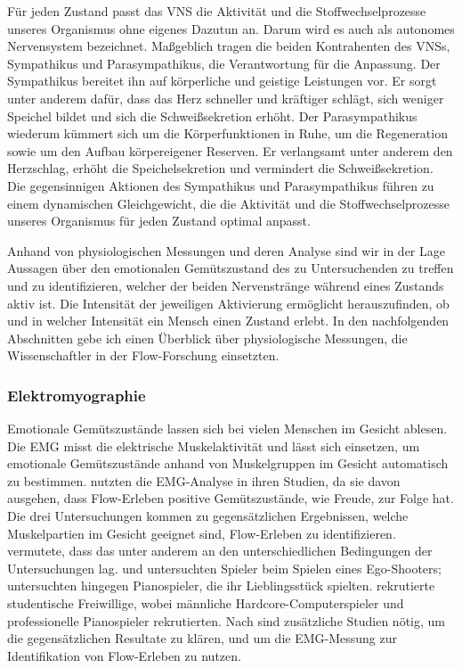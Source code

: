 Für jeden Zustand passt das \ac{VNS} die Aktivität und die Stoffwechselprozesse unseres Organismus ohne eigenes Dazutun an. Darum wird es auch als autonomes Nervensystem bezeichnet. Maßgeblich tragen die beiden Kontrahenten des \ac{VNS}s, Sympathikus und Parasympathikus, die Verantwortung für die Anpassung. Der Sympathikus bereitet ihn auf körperliche und geistige Leistungen vor. Er sorgt unter anderem dafür, dass das Herz schneller und kräftiger schlägt, sich weniger Speichel bildet und sich die Schweißsekretion erhöht. Der Parasympathikus wiederum kümmert sich um die Körperfunktionen in Ruhe, um die Regeneration sowie um den Aufbau körpereigener Reserven. Er verlangsamt unter anderem den Herzschlag, erhöht die Speichelsekretion und vermindert die Schweißsekretion. Die gegensinnigen Aktionen des Sympathikus und Parasympathikus führen zu einem dynamischen Gleichgewicht, die die Aktivität und die Stoffwechselprozesse unseres Organismus für jeden Zustand optimal anpasst. 

Anhand von physiologischen Messungen und deren Analyse sind wir in der Lage Aussagen über den emotionalen Gemütszustand des zu Untersuchenden zu treffen und zu identifizieren, welcher der beiden Nervenstränge während eines Zustands aktiv ist. Die Intensität der jeweiligen Aktivierung ermöglicht herauszufinden, ob und in welcher Intensität ein Mensch einen Zustand erlebt. In den nachfolgenden Abschnitten gebe ich einen Überblick über physiologische Messungen, die Wissenschaftler in der Flow-Forschung einsetzten.

\subsubsection{Elektromyographie} 

\label{ssub:elektromyographie}

Emotionale Gemütszustände lassen sich bei vielen Menschen im Gesicht ablesen. Die \ac{EMG} misst die elektrische Muskelaktivität und lässt sich einsetzen, um emotionale Gemütszustände anhand von Muskelgruppen im Gesicht automatisch zu bestimmen. \citet{Kivikangas2006, Nacke2008, deManzano2010} nutzten die \ac{EMG}-Analyse in ihren Studien, da sie davon ausgehen, dass Flow-Erleben positive Gemütszustände, wie Freude, zur Folge hat. Die drei Untersuchungen kommen zu gegensätzlichen Ergebnissen, welche Muskelpartien im Gesicht geeignet sind, Flow-Erleben zu identifizieren. \citet[][S.~153]{Peifer2012} vermutete, dass das unter anderem an den unterschiedlichen Bedingungen der Untersuchungen lag. \citet{Kivikangas2006} und \citet{Nacke2008} untersuchten Spieler beim Spielen eines Ego-Shooters; \citet{deManzano2010} untersuchten hingegen Pianospieler, die ihr Lieblingsstück spielten. \citet{Kivikangas2006} rekrutierte studentische Freiwillige, wobei \citet{Nacke2008} männliche Hardcore-Computerspieler und \citet{deManzano2010} professionelle Pianospieler rekrutierten. Nach \citet[][S.~153]{Peifer2012} sind zusätzliche Studien nötig, um die gegensätzlichen Resultate zu klären, und um die \ac{EMG}-Messung zur Identifikation von Flow-Erleben zu nutzen.

